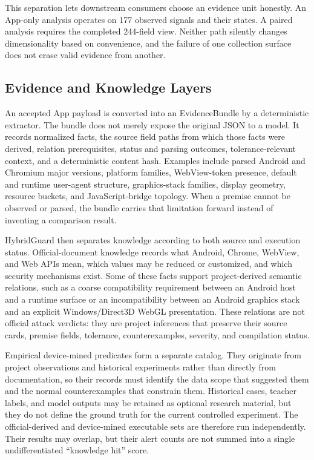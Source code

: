 This separation lets downstream consumers choose an evidence unit honestly. An App-only analysis operates on 177 observed signals and their states. A paired analysis requires the completed 244-field view. Neither path silently changes dimensionality based on convenience, and the failure of one collection surface does not erase valid evidence from another.

\subsection{Evidence and Knowledge Layers}

An accepted App payload is converted into an EvidenceBundle by a deterministic extractor. The bundle does not merely expose the original JSON to a model. It records normalized facts, the source field paths from which those facts were derived, relation prerequisites, status and parsing outcomes, tolerance-relevant context, and a deterministic content hash. Examples include parsed Android and Chromium major versions, platform families, WebView-token presence, default and runtime user-agent structure, graphics-stack families, display geometry, resource buckets, and JavaScript-bridge topology. When a premise cannot be observed or parsed, the bundle carries that limitation forward instead of inventing a comparison result.

HybridGuard then separates knowledge according to both source and execution status. Official-document knowledge records what Android, Chrome, WebView, and Web APIs mean, which values may be reduced or customized, and which security mechanisms exist. Some of these facts support project-derived semantic relations, such as a coarse compatibility requirement between an Android host and a runtime surface or an incompatibility between an Android graphics stack and an explicit Windows/Direct3D WebGL presentation. These relations are not official attack verdicts: they are project inferences that preserve their source cards, premise fields, tolerance, counterexamples, severity, and compilation status.

Empirical device-mined predicates form a separate catalog. They originate from project observations and historical experiments rather than directly from documentation, so their records must identify the data scope that suggested them and the normal counterexamples that constrain them. Historical cases, teacher labels, and model outputs may be retained as optional research material, but they do not define the ground truth for the current controlled experiment. The official-derived and device-mined executable sets are therefore run independently. Their results may overlap, but their alert counts are not summed into a single undifferentiated ``knowledge hit'' score.

